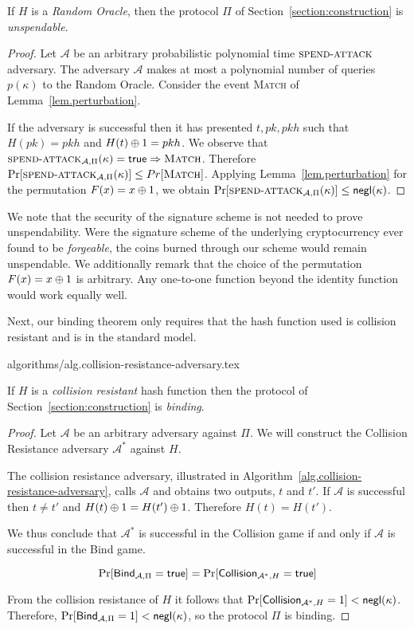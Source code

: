 \begin{theorem}[Unspendability]
  If $H$ is a \emph{Random Oracle}, then the protocol $\Pi$ of Section~\ref{section:construction} is \emph{unspendable}.
\end{theorem}
\begin{proof}
  Let $\mathcal{A}$ be an arbitrary probabilistic polynomial time $\textsc{spend}\-\text{-}\-\textsc{attack}$ adversary.
  The adversary $\mathcal{A}$ makes at most a polynomial number of queries $p(\kappa)$ to the Random Oracle.
  Consider the event \textsc{Match} of Lemma~\ref{lem.perturbation}.

  If the adversary is successful then it has presented $t, pk, pkh$ such that $H(pk) = pkh$ and $H(t) \oplus 1 = pkh$.
  We observe that $\textsc{spend}\-\text{-}\-\textsc{attack}_{\mathcal{A}, \Pi}(\kappa) = \mathsf{true} \Rightarrow \textsc{Match}$.
  Therefore $\Pr[\textsc{spend}\-\text{-}\-\textsc{attack}_{\mathcal{A}, \Pi}(\kappa)] \leq Pr[\textsc{Match}]$. Applying Lemma~\ref{lem.perturbation} for the permutation $F(x) = x \oplus 1$,
  we obtain
  $\Pr[\textsc{spend}\-\text{-}\-\textsc{attack}_{\mathcal{A}, \Pi}(\kappa)] \leq \textsf{negl}(\kappa)$.
\end{proof}

We note that the security of the signature scheme is not needed to prove unspendability. Were the signature scheme of the underlying cryptocurrency ever found to be \emph{forgeable}, the coins burned through our scheme would remain unspendable. We additionally remark that the
choice of the permutation $F(x) = x \oplus 1$ is arbitrary. Any one-to-one
function beyond the identity function would work equally well.

Next, our binding theorem only requires that the hash function used is collision
resistant and is in the standard model.

{algorithms/alg.collision-resistance-adversary.tex}

\begin{theorem}[Binding]
  If $H$ is a \emph{collision resistant} hash function then the protocol of Section~\ref{section:construction} is \emph{binding}.
\end{theorem}
\begin{proof}
  Let $\mathcal{A}$ be an arbitrary adversary against $\Pi$.
  We will construct the Collision Resistance adversary $\mathcal{A}^*$ against $H$.

  The collision resistance adversary, illustrated in Algorithm~\ref{alg.collision-resistance-adversary}, calls $\mathcal{A}$ and obtains two outputs, $t$ and $t'$. If $\mathcal{A}$ is successful then $t \neq t'$ and $H(t) \oplus 1 = H(t') \oplus 1$. Therefore $H(t) = H(t')$.

  We thus conclude that $\mathcal{A^*}$ is successful in the \textsf{Collision} game if and only if $\mathcal{A}$ is successful in the \textsf{Bind} game.

  \[
    \Pr[\textsf{Bind}_{\mathcal{A},\Pi} = \mathsf{true}]
    =
    \Pr[\textsf{Collision}_{\mathcal{A}^*,H} = \mathsf{true}]
  \]

  From the collision resistance of $H$ it follows that $\Pr[\textsf{Collision}_{\mathcal{A}^*,H} = 1] < \textsf{negl}(\kappa)$. Therefore,
  $\Pr[\textsf{Bind}_{\mathcal{A},\Pi} = 1] < \textsf{negl}(\kappa)$, so
  the protocol $\Pi$ is binding.
\end{proof}

